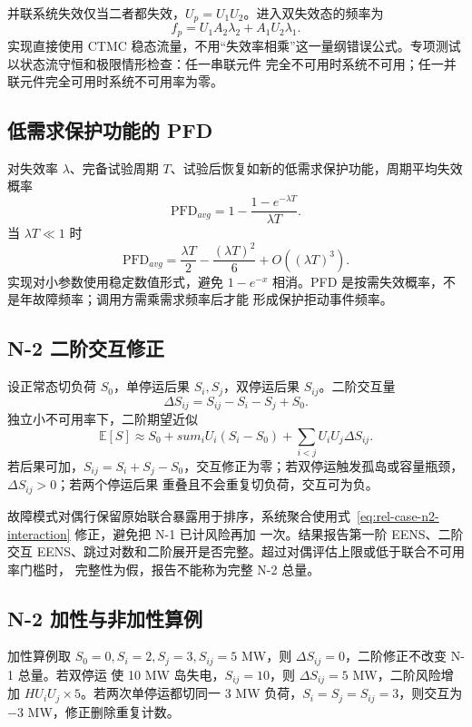 并联系统失效仅当二者都失效，$U_p=U_1U_2$。进入双失效态的频率为
\begin{equation}
 f_p=U_1A_2\lambda_2+A_1U_2\lambda_1.
\end{equation}
实现直接使用 CTMC 稳态流量，不用“失效率相乘”这一量纲错误公式。专项测试以状态流守恒和极限情形检查：任一串联元件
完全不可用时系统不可用；任一并联元件完全可用时系统不可用率为零。

\subsection{低需求保护功能的 PFD}
对失效率 $\lambda$、完备试验周期 $T$、试验后恢复如新的低需求保护功能，周期平均失效概率
\begin{equation}
 \mathrm{PFD}_{avg}=1-\frac{1-e^{-\lambda T}}{\lambda T}.
\end{equation}
当 $\lambda T\ll1$ 时
\begin{equation}
 \mathrm{PFD}_{avg}=\frac{\lambda T}{2}
 -\frac{(\lambda T)^2}{6}+O((\lambda T)^3).
\end{equation}
实现对小参数使用稳定数值形式，避免 $1-e^{-x}$ 相消。PFD 是按需失效概率，不是年故障频率；调用方需乘需求频率后才能
形成保护拒动事件频率。

\subsection{N-2 二阶交互修正}
设正常态切负荷 $S_0$，单停运后果 $S_i,S_j$，双停运后果 $S_{ij}$。二阶交互量
\begin{equation}\label{eq:rel-case-n2-interaction}
 \Delta S_{ij}=S_{ij}-S_i-S_j+S_0.
\end{equation}
独立小不可用率下，二阶期望近似
\begin{equation}
 \mathbb E[S]\approx S_0+sum_iU_i(S_i-S_0)
 +\sum_{i<j}U_iU_j\Delta S_{ij}.
\end{equation}
若后果可加，$S_{ij}=S_i+S_j-S_0$，交互修正为零；若双停运触发孤岛或容量瓶颈，$\Delta S_{ij}>0$；若两个停运后果
重叠且不会重复切负荷，交互可为负。

故障模式对偶行保留原始联合暴露用于排序，系统聚合使用式~\eqref{eq:rel-case-n2-interaction} 修正，避免把 N-1 已计风险再加
一次。结果报告第一阶 EENS、二阶交互 EENS、跳过对数和二阶展开是否完整。超过对偶评估上限或低于联合不可用率门槛时，
完整性为假，报告不能称为完整 N-2 总量。

\subsection{N-2 加性与非加性算例}
加性算例取 $S_0=0,S_i=2,S_j=3,S_{ij}=5$ MW，则 $\Delta S_{ij}=0$，二阶修正不改变 N-1 总量。若双停运
使 10 MW 岛失电，$S_{ij}=10$，则 $\Delta S_{ij}=5$ MW，二阶风险增加
$HU_iU_j\times5$。若两次单停运都切同一 3 MW 负荷，$S_i=S_j=S_{ij}=3$，则交互为 $-3$ MW，修正删除重复计数。

